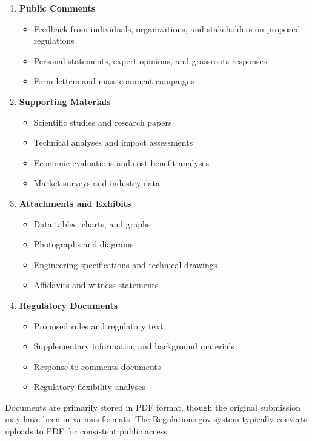 \begin{enumerate}
    \item \textbf{Public Comments}
    \begin{itemize}
        \item Feedback from individuals, organizations, and stakeholders on proposed regulations
        \item Personal statements, expert opinions, and grassroots responses
        \item Form letters and mass comment campaigns
    \end{itemize}
    
    \item \textbf{Supporting Materials}
    \begin{itemize}
        \item Scientific studies and research papers
        \item Technical analyses and impact assessments
        \item Economic evaluations and cost-benefit analyses
        \item Market surveys and industry data
    \end{itemize}
    
    \item \textbf{Attachments and Exhibits}
    \begin{itemize}
        \item Data tables, charts, and graphs
        \item Photographs and diagrams
        \item Engineering specifications and technical drawings
        \item Affidavits and witness statements
    \end{itemize}
    
    \item \textbf{Regulatory Documents}
    \begin{itemize}
        \item Proposed rules and regulatory text
        \item Supplementary information and background materials
        \item Response to comments documents
        \item Regulatory flexibility analyses
    \end{itemize}
\end{enumerate}

Documents are primarily stored in PDF format, though the original submission may have been in various formats. The Regulations.gov system typically converts uploads to PDF for consistent public access.

